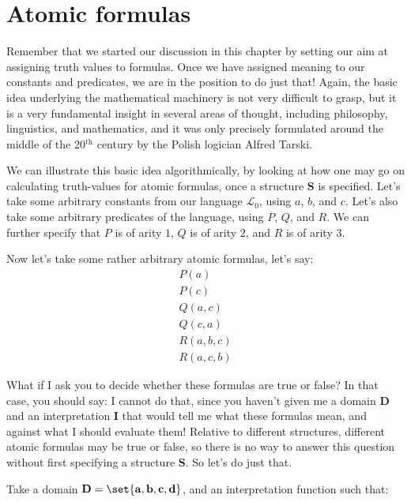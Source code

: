 \section{Atomic formulas}

Remember that we started our discussion in this chapter by setting our aim at assigning truth values to formulas. Once we have assigned meaning to our constants and predicates, we are in the position to do just that! Again, the basic idea underlying the mathematical machinery is not very difficult to grasp, but it is a very fundamental insight in several areas of thought, including philosophy, linguistics, and mathematics, and it was only precisely formulated around the middle of the 20$^\text{th}$ century by the Polish logician Alfred Tarski.

We can illustrate this basic idea algorithmically, by looking at how one may go on calculating truth-values for atomic formulas, once a structure $\mathbf{S}$ is specified. Let's take some arbitrary constants from our language $\mathcal{L}_0$, using $a$, $b$, and $c$. Let's also take some arbitrary predicates of the language, using $P$, $Q$, and $R$. We can further specify that $P$ is of arity $1$, $Q$ is of arity $2$, and $R$ is of arity $3$. 

Now let's take some rather arbitrary atomic formulas, let's say:
\begin{gather}
	P(a)\label{ex1}\\
	P(c)\label{ex2}\\
	Q(a, c)\label{ex3}\\
	Q(c, a)\label{ex4}\\
	R(a, b, c)\label{ex5}\\
	R(a, c, b)\label{ex6}
\end{gather}

What if I ask you to decide whether these formulas are true or false? In that case, you should say: I cannot do that, since you haven't given me a domain $\mathbf{D}$ and an interpretation $\mathbf{I}$ that would tell me what these formulas mean, and against what I should evaluate them! Relative to different structures, different atomic formulas may be true or false, so there is no way to answer this question without first specifying a structure $\mathbf{S}$. So let's do just that. 

Take a domain $\mathbf{D}=\set{\mathbf{a}, \mathbf{b}, \mathbf{c}, \mathbf{d}}$, and an interpretation function such that:

